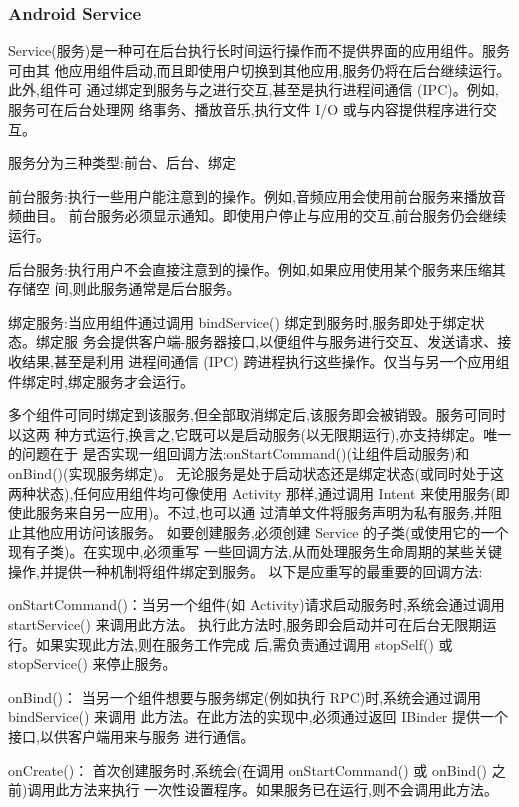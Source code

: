 \documentclass[UTF8]{ctexart}
\begin{document}
\subsubsection{Android Service}
Service(服务)是一种可在后台执行长时间运行操作而不提供界面的应用组件。服务可由其
他应用组件启动,而且即使用户切换到其他应用,服务仍将在后台继续运行。此外,组件可
通过绑定到服务与之进行交互,甚至是执行进程间通信 (IPC)。例如,服务可在后台处理网
络事务、播放音乐,执行文件 I/O 或与内容提供程序进行交互。
\par
服务分为三种类型:前台、后台、绑定
\par
前台服务:执行一些用户能注意到的操作。例如,音频应用会使用前台服务来播放音频曲目。
前台服务必须显示通知。即使用户停止与应用的交互,前台服务仍会继续运行。
\par
后台服务:执行用户不会直接注意到的操作。例如,如果应用使用某个服务来压缩其存储空
间,则此服务通常是后台服务。
\par
绑定服务:当应用组件通过调用 bindService() 绑定到服务时,服务即处于绑定状态。绑定服
务会提供客户端-服务器接口,以便组件与服务进行交互、发送请求、接收结果,甚至是利用
进程间通信 (IPC) 跨进程执行这些操作。仅当与另一个应用组件绑定时,绑定服务才会运行。
\par
多个组件可同时绑定到该服务,但全部取消绑定后,该服务即会被销毁。服务可同时以这两
种方式运行,换言之,它既可以是启动服务(以无限期运行),亦支持绑定。唯一的问题在于
是否实现一组回调方法:onStartCommand()(让组件启动服务)和 onBind()(实现服务绑定)。
无论服务是处于启动状态还是绑定状态(或同时处于这两种状态),任何应用组件均可像使用
Activity 那样,通过调用 Intent 来使用服务(即使此服务来自另一应用)。不过,也可以通
过清单文件将服务声明为私有服务,并阻止其他应用访问该服务。
如要创建服务,必须创建 Service 的子类(或使用它的一个现有子类)。在实现中,必须重写
一些回调方法,从而处理服务生命周期的某些关键操作,并提供一种机制将组件绑定到服务。
以下是应重写的最重要的回调方法:
\par
onStartCommand()：当另一个组件(如 Activity)请求启动服务时,系统会通过调用 startService() 来调用此方法。
执行此方法时,服务即会启动并可在后台无限期运行。如果实现此方法,则在服务工作完成
后,需负责通过调用 stopSelf() 或 stopService() 来停止服务。
\par
onBind()：
当另一个组件想要与服务绑定(例如执行 RPC)时,系统会通过调用 bindService() 来调用
此方法。在此方法的实现中,必须通过返回 IBinder 提供一个接口,以供客户端用来与服务
进行通信。
\par
onCreate()：
首次创建服务时,系统会(在调用 onStartCommand() 或 onBind() 之前)调用此方法来执行
一次性设置程序。如果服务已在运行,则不会调用此方法。
\par
\end{document}
